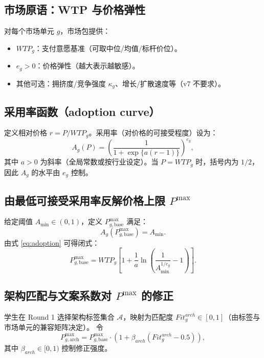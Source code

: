 \documentclass[UTF8,12pt]{ctexart}
\begin{document}
\subsection{市场原语：WTP 与价格弹性}
对每个市场单元 $g$，市场包提供：
\begin{itemize}
  \item $WTP_g$：支付意愿基准（可取中位/均值/标杆价位）。
  \item $e_g>0$：价格弹性（越大表示越敏感）。
  \item 其他可选：拥挤度/竞争强度 $\kappa_g$、增长/扩散速度等（v7 不要求）。
\end{itemize}

\subsection{采用率函数（adoption curve）}
定义相对价格 $r=P/WTP_g$。采用率（对价格的可接受程度）设为：
\begin{equation}
A_g(P)=\left(\frac{1}{1+\exp\{a(r-1)\}}\right)^{e_g},
\label{eq:adoption}
\end{equation}
其中 $a>0$ 为斜率（全局常数或按行业设定）。当 $P=WTP_g$ 时，括号内为 $1/2$，因此 $A_g$ 的水平由 $e_g$ 控制。

\subsection{由最低可接受采用率反解价格上限 $P^{\max}$}
给定阈值 $A_{\min}\in(0,1)$，定义 $P^{\max}_{g,\mathrm{base}}$ 满足：
\begin{equation}
A_g(P^{\max}_{g,\mathrm{base}})=A_{\min}.
\end{equation}
由式 \eqref{eq:adoption} 可得闭式：
\begin{equation}
P^{\max}_{g,\mathrm{base}}
= WTP_g\left[1+\frac{1}{a}\ln\!\left(\frac{1}{A_{\min}^{1/e_g}}-1\right)\right].
\label{eq:pmax_base}
\end{equation}

\subsection{架构匹配与文案系数对 $P^{\max}$ 的修正}
学生在 Round 1 选择架构标签集合 $\mathcal{A}$，映射为匹配度 $Fit^{arch}_g\in[0,1]$（由标签与市场单元的兼容矩阵决定）。
令
\begin{equation}
P^{\max}_{g,\mathrm{arch}} = P^{\max}_{g,\mathrm{base}}\cdot\left(1+\beta_{arch}(Fit^{arch}_g-0.5)\right),
\end{equation}
其中 $\beta_{arch}\in[0,1)$ 控制修正强度。
\end{document}
